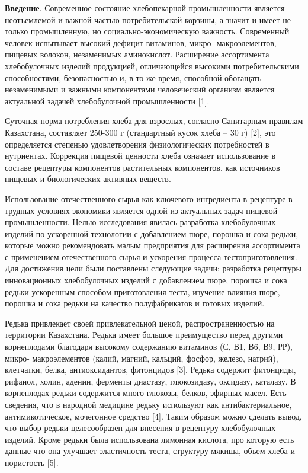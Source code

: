 \begin{multicols}{2}
{\bfseries Введение}. Современное состояние хлебопекарной промышленности
является неотъемлемой и важной частью потребительской корзины, а значит
и имеет не только промышленную, но социально-экономическую важность.
Современный человек испытывает высокий дефицит витаминов, микро-
макроэлементов, пищевых волокон, незаменимых аминокислот. Расширение
ассортимента хлебобулочных изделий продукцией, отличающейся высокими
потребительскими способностями, безопасностью и, в то же время,
способной обогащать незаменимыми и важными компонентами человеческий
организм является актуальной задачей хлебобулочной промышленности
{[}1{]}.

Суточная норма потребления хлеба для взрослых, согласно Санитарным
правилам Казахстана, составляет 250-300 г (стандартный кусок хлеба -- 30
г) {[}2{]}, это определяется степенью удовлетворения физиологических
потребностей в нутриентах. Коррекция пищевой ценности хлеба означает
использование в составе рецептуры компонентов растительных компонентов,
как источников пищевых и биологических активных веществ.

Использование отечественного сырья как ключевого ингредиента в рецептуре
в трудных условиях экономики является одной из актуальных задач пищевой
промышленности. Целью исследования явилась разработка хлебобулочных
изделий по ускоренной технологии с добавлением пюре, порошка и сока
редьки, которые можно рекомендовать малым предприятия для расширения
ассортимента с применением отечественного сырья и ускорения процесса
тестоприготовления. Для достижения цели были поставлены следующие
задачи: разработка рецептуры инновационных хлебобулочных изделий с
добавлением пюре, порошка и сока редьки ускоренным способом
приготовления теста, изучение влияния пюре, порошка и сока редьки на
качество полуфабрикатов и готовых изделий.

Редька привлекает своей привлекательной ценой, распространенностью на
территории Казахстана. Редька имеет большое преимущество перед другими
корнеплодами благодаря высокому содержанию витаминов (С, В1, В6, В9,
РР), микро- макроэлементов (калий, магний, кальций, фосфор, железо,
натрий), клетчатки, белка, антиоксидантов, фитонцидов {[}3{]}. Редька
содержит фитонциды, рифанол, холин, аденин, ферменты диастазу,
глюкозидазу, оксидазу, каталазу. В корнеплодах редьки содержится много
глюкозы, белков, эфирных масел. Есть сведения, что в народной медицине
редьку используют как антибактериальное, антимикотическое, мочегонное
средство {[}4{]}. Таким образом можно сделать вывод, что выбор редьки
целесообразен для внесения в рецептуру хлебобулочных изделий. Кроме
редьки была использована лимонная кислота, про которую есть данные что
она улучшает эластичность теста, структуру мякиша, объем хлеба и
пористость {[}5{]}.


\end{multicols}
